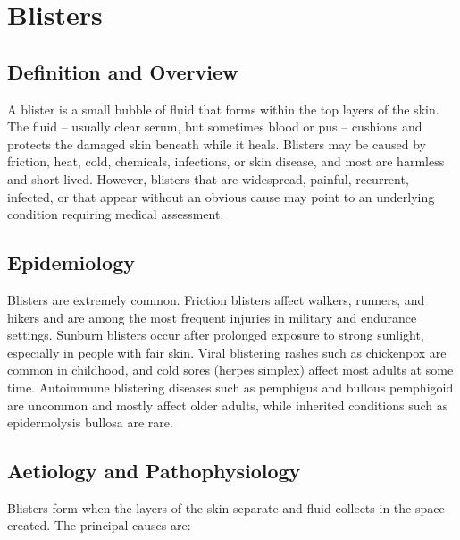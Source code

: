 \chapter{Blisters}

\section*{Definition and Overview}
A blister is a small bubble of fluid that forms within the top layers of the skin. The fluid -- usually clear serum, but sometimes blood or pus -- cushions and protects the damaged skin beneath while it heals. Blisters may be caused by friction, heat, cold, chemicals, infections, or skin disease, and most are harmless and short-lived. However, blisters that are widespread, painful, recurrent, infected, or that appear without an obvious cause may point to an underlying condition requiring medical assessment.

\section*{Epidemiology}
Blisters are extremely common. Friction blisters affect walkers, runners, and hikers and are among the most frequent injuries in military and endurance settings. Sunburn blisters occur after prolonged exposure to strong sunlight, especially in people with fair skin. Viral blistering rashes such as chickenpox are common in childhood, and cold sores (herpes simplex) affect most adults at some time. Autoimmune blistering diseases such as pemphigus and bullous pemphigoid are uncommon and mostly affect older adults, while inherited conditions such as epidermolysis bullosa are rare.

\section*{Aetiology and Pathophysiology}
Blisters form when the layers of the skin separate and fluid collects in the space created. The principal causes are:

